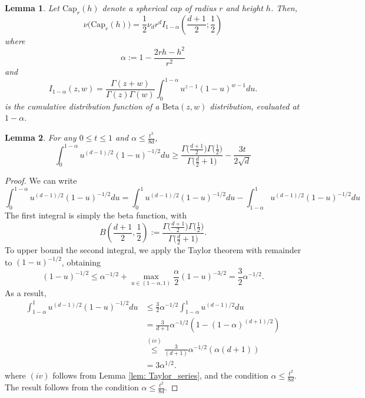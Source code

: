 \documentclass{article}
\newcommand{\1}{\mathbf{1}}
\theoremstyle{aldenthm}
\newtheorem{lemma}{Lemma}
\begin{document}
\begin{lemma}
	\label{lem: volume_of_spherical_cap}
	Let $\mathrm{Cap}_r(h)$ denote a spherical cap of radius $r$ and height $h$. Then, 
	\begin{equation*}
	\nu\bigl( \mathrm{Cap}_r(h)  \bigr) = \frac{1}{2} \nu_d r^d I_{1 - \alpha}(\frac{d + 1}{2}; \frac{1}{2})
	\end{equation*}
	where
	\begin{equation*}
	\alpha := 1 - \frac{2 r h - h^2}{r^2}
	\end{equation*}
	and
	\begin{equation*}
	I_{1 - \alpha}(z,w) = \frac{\Gamma(z + w)}{\Gamma(z) \Gamma(w)} \int_{0}^{1 - \alpha} u^{z - 1} (1 - u)^{w - 1} du.
	\end{equation*}
	is the cumulative distribution function of a $\mathrm{Beta}(z,w)$ distribution, evaluated at $1 - \alpha$. 
\end{lemma}

\begin{lemma}
	\label{lem: beta_integral}
	For any $0 \leq t \leq 1$ and $\alpha \leq \frac{t^2}{8 d}$,
	\begin{equation*}
	\int_{0}^{1 - \alpha}u^{(d-1)/2}(1 - u)^{-1/2}du \geq \frac{\Gamma\bigl(\frac{d + 1}{2}\bigr)\Gamma\bigl(\frac{1}{2}\bigr)}{ \Gamma\bigl(\frac{d}{2}+ 1\bigr)} - \frac{3t}{2\sqrt{d}}
	\end{equation*}
\end{lemma}
\begin{proof}
	We can write 
	\begin{equation*}
	\int_{0}^{1 - \alpha}u^{(d-1)/2}(1 - u)^{-1/2}du = \int_{0}^{1}u^{(d-1)/2}(1 - u)^{-1/2}du - \int_{1 - \alpha}^{1}u^{(d-1)/2}(1 - u)^{-1/2}du
	\end{equation*}
	The first integral is simply the beta function, with
	\begin{equation*}
	B(\frac{d+1}{2},\frac{1}{2}) := \frac{\Gamma\bigl(\frac{d + 1}{2}\bigr)\Gamma\bigl(\frac{1}{2}\bigr)}{ \Gamma\bigl(\frac{d}{2}+ 1\bigr)}.
	\end{equation*}
	To upper bound the second integral, we apply the Taylor theorem with remainder to $(1 - u)^{-1/2}$, obtaining
	\begin{equation*}
	(1 - u)^{-1/2} \leq \alpha^{-1/2} + \max_{u \in (1 - \alpha, 1)} \frac{\alpha}{2} (1 - u)^{-3/2} = \frac{3}{2}\alpha^{-1/2}.
	\end{equation*}
	As a result,
	\begin{align*}
	\int_{1 - \alpha}^{1}u^{(d-1)/2}(1 - u)^{-1/2}du & \leq \frac{3}{2}\alpha^{-1/2} \int_{1 - \alpha}^{1}u^{(d-1)/2}du \\
	& = \frac{3}{d+1}\alpha^{-1/2} \left(1 - (1 - \alpha)^{(d + 1)/2}\right) \\
	& \overset{(iv)}{\leq} \frac{3}{(d+1)}\alpha^{-1/2} (\alpha(d + 1)) \\
	& =  3\alpha^{1/2}.
	\end{align*}
	where $(iv)$ follows from Lemma \ref{lem: Taylor_series}, and the condition $\alpha \leq \frac{t^2}{8d}$. The result follows from the condition $\alpha \leq \frac{t^2}{8d}$. 
\end{proof}
\end{document}
